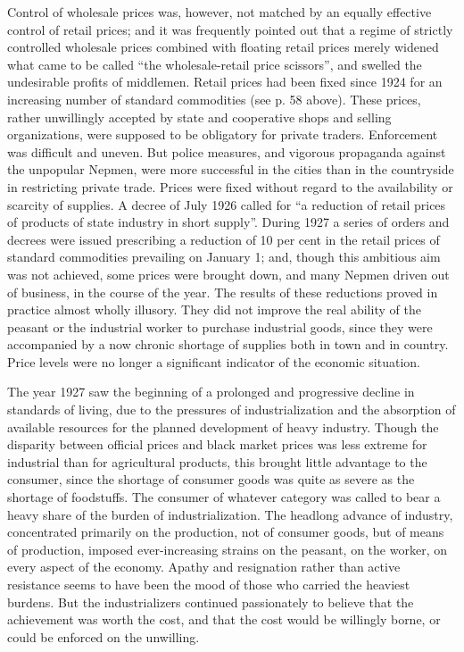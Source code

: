 Control of wholesale prices was, however, not matched by an equally effective control of retail prices; and it was frequently pointed out that a regime of strictly controlled wholesale prices combined with floating retail prices merely widened what came to be called ``the wholesale-retail price scissors'', and swelled the undesirable profits of middlemen. Retail prices had been fixed since 1924 for an increasing number of standard commodities (see p. 58 above). These prices, rather unwillingly accepted by state and cooperative shops and selling organizations, were supposed to be obligatory for private traders. Enforcement was difficult and uneven. But police measures, and vigorous propaganda against the unpopular Nepmen, were more successful in the cities than in the countryside in restricting private trade. Prices were fixed without regard to the availability or scarcity of supplies. A decree of July 1926 called for ``a reduction of retail prices of products of state industry in short supply''. During 1927 a series of orders and decrees were issued prescribing a reduction of 10 per cent in the retail prices of standard commodities prevailing on January 1; and, though this ambitious aim was not achieved, some prices were brought down, and many Nepmen driven out of business, in the course of the year. The results of these reductions proved in practice almost wholly illusory. They did not improve the real ability of the peasant or the industrial worker to purchase industrial goods, since they were accompanied by a now chronic shortage of supplies both in town and in country. Price levels were no longer a significant indicator of the economic situation. 

The year 1927 saw the beginning of a prolonged and progressive decline in standards of living, due to the pressures of industrialization and the absorption of available resources for the planned development of heavy industry. Though the disparity between official prices and black market prices was less extreme for industrial than for agricultural products, this brought little advantage to the consumer, since the shortage of consumer goods was quite as severe as the shortage of foodstuffs. The consumer of whatever category was called to bear a heavy share of the burden of industrialization. The headlong advance of industry, concentrated primarily on the production, not of consumer goods, but of means of production, imposed ever-increasing strains on the peasant, on the worker, on every aspect of the economy. Apathy and resignation rather than active resistance seems to have been the mood of those who carried the heaviest burdens. But the industrializers continued passionately to believe that the achievement was worth the cost, and that the cost would be willingly borne, or could be enforced on the unwilling. 

